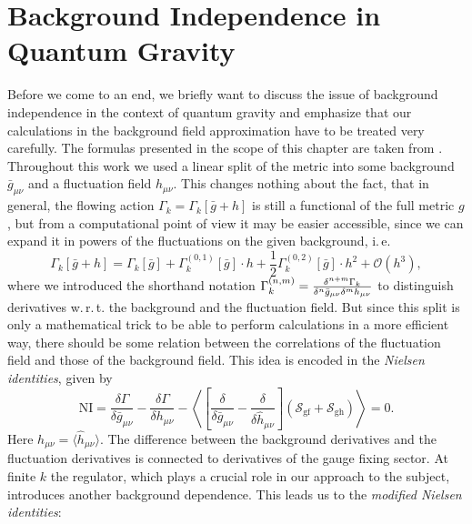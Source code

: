 \chapter{Background Independence in Quantum Gravity}\label{chap:BGindependence}
Before we come to an end, we briefly want to discuss the issue of background independence in the context of quantum gravity and emphasize that our calculations in the background field approximation have to be treated very carefully. The formulas presented in the scope of this chapter are taken from \cite{PawlowskiNPgaugeLecture}.\\
Throughout this work we used a linear split of the metric  into some background $\bar{g}_{\mu\nu}$ and a fluctuation field $h_{\mu\nu}$. This changes nothing about the fact, that in general, the flowing action $\Gamma_k = \Gamma_k[\bar{g} + h]$ is still a functional of the full metric $g$, but from a computational point of view it may be easier accessible, since we can expand it in powers of the fluctuations on the given background, i.\,e.
\begin{equation}
	\Gamma_k\left[\bar{g} + h\right] = \Gamma_k\left[\bar{g}\right] +  \Gamma_k^{(0,1)}\left[\bar{g}\right]\cdot h + \frac{1}{2}\Gamma_k^{(0,2)}\left[\bar{g}\right]\cdot h^2 +\mathcal{O}(h^3),
\label{eqn:vertex_expansion}
\end{equation}
where we introduced the shorthand notation $\Gamma_k^{(n,m)} = \frac{\delta^{n+m}\Gamma_{k}}{\delta^n\bar{g}_{\mu\nu}\delta^mh_{\mu\nu}}$ to distinguish derivatives w.\,r.\,t. the background and the fluctuation field. But since this split is only a mathematical trick to be able to perform calculations in a more efficient way, there should be some relation between the correlations of the fluctuation field and those of the background field.
This idea is encoded in the \textit{Nielsen identities}, given by
\begin{equation}
	 \mathrm{NI}=\frac{\delta \Gamma}{\delta \bar{g}_{\mu \nu}}-\frac{\delta \Gamma}{\delta h_{\mu \nu}}-\left\langle\left[\frac{\delta}{\delta \bar{g}_{\mu \nu}}-\frac{\delta}{\delta \hat{h}_{\mu \nu}}\right]\left(\mathcal{S}_{\mathrm{gf}}+\mathcal{S}_{\mathrm{gh}}\right)\right\rangle= 0.
\end{equation}
Here $h_{\mu\nu}=\langle\hat{h}_{\mu\nu}\rangle$. The difference between the background derivatives and the fluctuation derivatives is connected to derivatives of the gauge fixing sector. At finite $k$ the regulator, which plays a crucial role in our approach to the subject, introduces another background dependence. This leads us to the \textit{modified Nielsen identities}:
